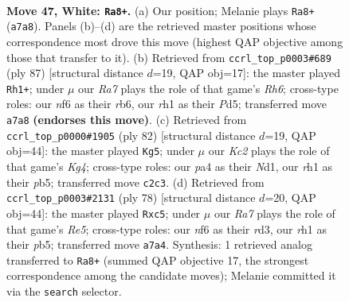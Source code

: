\documentclass[11pt]{article}
\begin{document}
\clearpage

\begin{figure}[p]\centering
\begin{subfigure}{0.46\textwidth}\centering
\resizebox{\linewidth}{!}{%
\newchessgame
\chessboard[
  setfen={3k4/R7/5n2/1P1P4/p1p3P1/8/1PK5/7r w - - 5 47},
  showmover=false,
  pgfstyle=straightmove, color=movearrow, markmove={a7-a8}
]}
\caption{}
\end{subfigure}\hfill
\begin{subfigure}{0.46\textwidth}\centering
\resizebox{\linewidth}{!}{%
\newchessgame
\chessboard[
  setfen={6k1/6p1/1R6/1p1p3P/8/7r/P7/3K4 b - - 2 44},
  showmover=false,
  pgfstyle=straightmove, color=movearrow, markmove={h3-h1}
]}
\caption{}
\end{subfigure}
\\[4pt]
\begin{subfigure}{0.46\textwidth}\centering
\resizebox{\linewidth}{!}{%
\newchessgame
\chessboard[
  setfen={2k5/2p5/6p1/1pn5/4PPK1/1P6/8/3N4 w - - 3 42},
  showmover=false,
  pgfstyle=straightmove, color=movearrow, markmove={g4-g5}
]}
\caption{}
\end{subfigure}\hfill
\begin{subfigure}{0.46\textwidth}\centering
\resizebox{\linewidth}{!}{%
\newchessgame
\chessboard[
  setfen={8/5p2/7k/1pp1R3/8/1P1r2P1/5P2/6K1 w - - 0 40},
  showmover=false,
  pgfstyle=straightmove, color=movearrow, markmove={e5-c5}
]}
\caption{}
\end{subfigure}
\caption{\textbf{Move 47, White: \texttt{Ra8+}.} (a) Our position; Melanie plays \texttt{Ra8+} (\texttt{a7a8}). Panels (b)--(d) are the retrieved master positions whose correspondence most drove this move (highest QAP objective among those that transfer to it). (b) Retrieved from \texttt{ccrl\_top\_p0003\#689} (ply 87) [structural distance $d$=19, QAP obj=17]: the master played \texttt{Rh1+}; under $\mu$ our \emph{Ra7} plays the role of that game's \emph{Rh6}; cross-type roles: our \emph{n}f6 as their \emph{r}b6, our \emph{r}h1 as their \emph{P}d5; transferred move \texttt{a7a8} \textbf{(endorses this move)}. (c) Retrieved from \texttt{ccrl\_top\_p0000\#1905} (ply 82) [structural distance $d$=19, QAP obj=44]: the master played \texttt{Kg5}; under $\mu$ our \emph{Kc2} plays the role of that game's \emph{Kg4}; cross-type roles: our \emph{p}a4 as their \emph{N}d1, our \emph{r}h1 as their \emph{p}b5; transferred move \texttt{c2c3}. (d) Retrieved from \texttt{ccrl\_top\_p0003\#2131} (ply 78) [structural distance $d$=20, QAP obj=44]: the master played \texttt{Rxc5}; under $\mu$ our \emph{Ra7} plays the role of that game's \emph{Re5}; cross-type roles: our \emph{n}f6 as their \emph{r}d3, our \emph{r}h1 as their \emph{p}b5; transferred move \texttt{a7a4}. Synthesis: 1 retrieved analog transferred to \texttt{Ra8+} (summed QAP objective 17, the strongest correspondence among the candidate moves); Melanie committed it via the \texttt{search} selector.}
\label{fig:thought-m92}
\end{figure}
\end{document}
